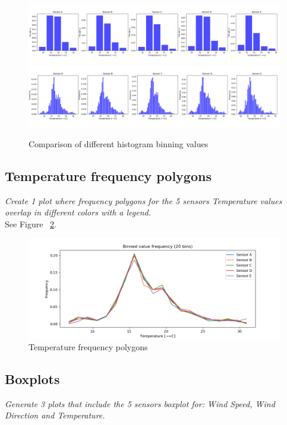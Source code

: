 \documentclass{article}
\begin{document}
\begin{figure}[!htb]
\centering
\includegraphics[width=\textwidth]{1-2-5_bins.png}
\includegraphics[width=\textwidth]{1-2-50_bins.png}
\caption{Comparison of different histogram binning values}
\label{fig:1-2}
\end{figure}


\newpage

\subsection{Temperature frequency polygons}
\textit{
Create 1 plot where frequency polygons for the 5 sensors Temperature values overlap in different colors with a legend.
}\\

See Figure ~\ref{fig:1-3}.

\begin{figure}[!htb]
\centering
\includegraphics[width=\textwidth]{1-3-freq.png}
\caption{Temperature frequency polygons}
\label{fig:1-3}
\end{figure}

\subsection{Boxplots}
\textit{
Generate 3 plots that include the 5 sensors boxplot for: Wind Speed, Wind Direction and Temperature.
}\\
\end{document}
